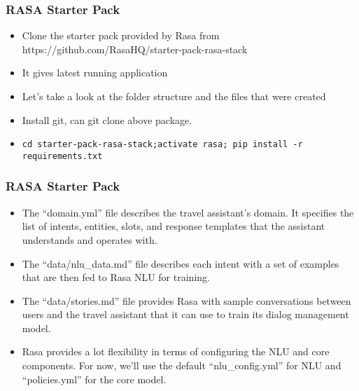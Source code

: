  \begin{frame}[fragile]\frametitle{RASA Starter Pack}
\begin{itemize}
\item Clone the starter pack provided by Rasa from https://github.com/RasaHQ/starter-pack-rasa-stack
\item It gives latest running application
\item Let's take a look at the folder structure and the files that were created 
\item Install git, can git clone above package.
\item \lstinline|cd starter-pack-rasa-stack;activate rasa; pip install -r requirements.txt|

\end{itemize}
\end{frame}

 \begin{frame}[fragile]\frametitle{RASA Starter Pack}
\begin{itemize}
\item The ``domain.yml'' file describes the travel assistant's domain. It specifies the list of intents, entities, slots, and response templates that the assistant understands and operates with.
\item The ``data/nlu\_data.md'' file describes each intent with a set of examples that are then fed to Rasa NLU for training.
\item The ``data/stories.md'' file provides Rasa with sample conversations between users and the travel assistant that it can use to train its dialog management model.
\item Rasa provides a lot flexibility in terms of configuring the NLU and core components. For now, we'll use the default ``nlu\_config.yml'' for NLU and ``policies.yml'' for the core model.
\end{itemize}


\end{frame}

